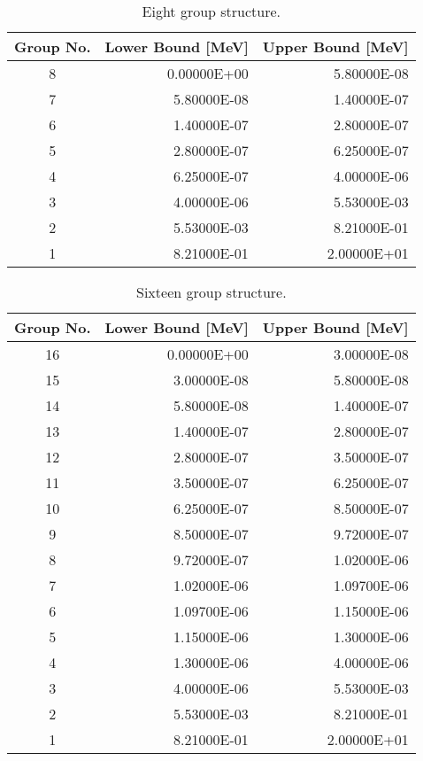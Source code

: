 \begin{appendices}
\begin{table}[h!]
  \centering
  \footnotesize
  \caption{Eight group structure.}
  \label{table:app-8-groups} 
  \vspace{14pt}
  \begin{tabular}{c r r}
    \toprule
    {\bf Group No.} &
    {\bf Lower Bound [MeV]} &
    {\bf Upper Bound [MeV]} \\
    \midrule
8 & 0.00000E+00 & 5.80000E-08 \\
7 & 5.80000E-08 & 1.40000E-07 \\
6 & 1.40000E-07 & 2.80000E-07 \\
5 & 2.80000E-07 & 6.25000E-07 \\
4 & 6.25000E-07 & 4.00000E-06 \\
3 & 4.00000E-06 & 5.53000E-03 \\
2 & 5.53000E-03 & 8.21000E-01 \\
1 & 8.21000E-01 & 2.00000E+01 \\
  \bottomrule
 \end{tabular}
\end{table}

\begin{table}[h!]
  \centering
  \footnotesize
  \caption{Sixteen group structure.}
  \label{table:app-16-groups} 
  \vspace{14pt}
  \begin{tabular}{c r r}
    \toprule
    {\bf Group No.} &
    {\bf Lower Bound [MeV]} &
    {\bf Upper Bound [MeV]} \\
    \midrule
16 & 0.00000E+00 & 3.00000E-08 \\
15 & 3.00000E-08 & 5.80000E-08 \\
14 & 5.80000E-08 & 1.40000E-07 \\
13 & 1.40000E-07 & 2.80000E-07 \\
12 & 2.80000E-07 & 3.50000E-07 \\
11 & 3.50000E-07 & 6.25000E-07 \\
10 & 6.25000E-07 & 8.50000E-07 \\
9 & 8.50000E-07 & 9.72000E-07 \\
8 & 9.72000E-07 & 1.02000E-06 \\
7 & 1.02000E-06 & 1.09700E-06 \\
6 & 1.09700E-06 & 1.15000E-06 \\
5 & 1.15000E-06 & 1.30000E-06 \\
4 & 1.30000E-06 & 4.00000E-06 \\
3 & 4.00000E-06 & 5.53000E-03 \\
2 & 5.53000E-03 & 8.21000E-01 \\
1 & 8.21000E-01 & 2.00000E+01 \\
  \bottomrule
 \end{tabular}
\end{table}


\end{appendices}
